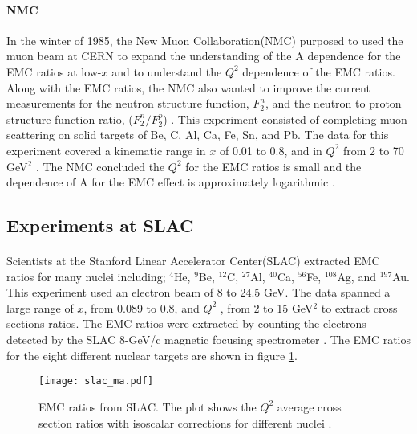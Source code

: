 \paragraph{NMC}In the winter of 1985, the New Muon Collaboration(NMC) purposed to used the muon beam at CERN to expand the understanding of the A dependence for the EMC ratios at low-$x$ and to understand the $Q^2$ dependence of the EMC ratios. Along with the EMC ratios, the NMC also wanted to improve the current measurements for the neutron structure function, $F_2^n$, and the neutron to proton structure function ratio, ($F_2^n/F_2^p$) \cite{NMCtech}. This experiment consisted of completing muon scattering on solid targets of Be, C, Al, Ca, Fe, Sn, and Pb. The data for this experiment covered a kinematic range in $x$ of 0.01 to 0.8, and in $Q^2$ from 2 to 70 GeV$^2$ \cite{ref:NMC}. The NMC concluded the $Q^2$ for the EMC ratios is small and the dependence of A for the EMC effect is approximately logarithmic \cite{ref:NMC,Ajth}. 

\subsection{Experiments at SLAC}
\paragraph{}Scientists at the Stanford Linear Accelerator Center(SLAC) extracted EMC ratios for many nuclei including; $^4$He, $^9$Be, $^{12}$C, $^{27}$Al, $^{40}$Ca, $^{56}$Fe, $^{108}$Ag, and $^{197}$Au. This experiment used an electron beam of 8 to 24.5 GeV. The data spanned a large range of $x$, from 0.089 to 0.8, and $Q^2$ , from 2 to 15 GeV$^2$ to extract cross sections ratios. The EMC ratios were extracted by counting the electrons detected by the SLAC 8-GeV/c magnetic focusing spectrometer \cite{gomez}. The EMC ratios for the eight different nuclear targets are shown in figure \ref{gomez_ma}.
\begin{figure}[]
	\centering
		\texttt{[image: slac\_ma.pdf]} 
		\caption{EMC ratios from SLAC. The plot shows the $Q^2$ average cross section ratios with isoscalar corrections for different nuclei \cite{gomez}.}
		\label{gomez_ma}
\end{figure} 
